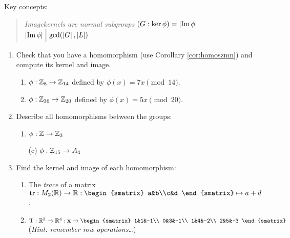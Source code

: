 \begin{exercises}{}{}
	Key concepts:
	\begin{quote}
		\emph{Image\qquad kernels are normal subgroups\qquad 
		$(G:\ker\phi)=\left| \operatorname{Im}\phi\right|$\qquad
		$\left| \operatorname{Im}\phi\right|\Bigm|\gcd(\left| G\right|,\left| L\right|)$}
	\end{quote}
	
	
	\begin{enumerate}
	  \item Check that you have a homomorphism (use Corollary \ref{cor:homoszmn}) and compute its kernel and image.
	  \begin{enumerate}
	    \item $\phi:\mathbb{Z}_{8}\to\mathbb{Z}_{14}$ defined by $\phi(x)=7x\pmod{14}$.
	    
	    \item $\phi:\mathbb{Z}_{36}\to\mathbb{Z}_{20}$ defined by $\phi(x)=5x\pmod{20}$.
		\end{enumerate}
	
		
		\item Describe all homomorphisms between the groups:
		\begin{enumerate}
		  \item {}\lstsp $\phi:\mathbb{Z}\to\mathbb{Z}_3$ 
		  \item[(c)] \lstsp $\phi:\mathbb{Z}_{15}\to A_4$
		\end{enumerate}
		
			
		\item Find the kernel and image of each homomorphism:
		\begin{enumerate}
		  \item The \emph{trace} of a matrix $\tr:M_2(\R)\to\R:
		  \smash{
			  \begin{smatrix}
					a&b\\c&d
			  \end{smatrix}
		  }
		  \mapsto a+d$.
			
			\item $\rT:\R^3\to\R^4:\vx\mapsto 
			\begin{smatrix}
				1&1&-1\\
				0&3&-1\\
				1&4&-2\\
				2&5&-3
			\end{smatrix}$
			\quad (\emph{Hint: remember row operations\ldots})
		\end{enumerate}
		
		
		

\end{enumerate}
\end{exercises}
